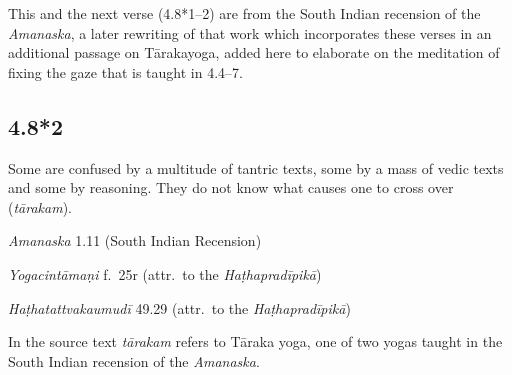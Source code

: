 \begin{ekdosis}
\begin{philcomm}[hp04_008_1]
This and the next verse (4.8*1–2) are from the South Indian recension of the \emph{Amanaska}, a later rewriting of that work which incorporates these verses in an additional passage on Tārakayoga, added here to elaborate on the meditation of fixing the gaze that is taught in 4.4–7. 
\end{philcomm}

\subsection*{4.8*2}
\begin{translation}[hp04_008_2]
Some are confused by a multitude of tantric texts, some by a mass of vedic texts and some by reasoning. They do not know what causes one to cross over (\emph{tārakam}).%
\end{translation}


\begin{sources}[hp04_008_2]
\emph{Amanaska} 1.11 (South Indian Recension)
\begin{versinnote}
\end{versinnote}
\end{sources}

\begin{testimonia}[hp04_008_2]
\emph{Yogacintāmaṇi} f.~25r (attr.~to the \emph{Haṭhapradīpikā})
\begin{versinnote}
\end{versinnote}

\emph{Haṭhatattvakaumudī} 49.29 (attr.~to the \emph{Haṭhapradīpikā})
\begin{versinnote}
\end{versinnote}
\end{testimonia}

\begin{philcomm}[hp04_008_2]
In the source text \emph{tārakam} refers to Tāraka yoga, one of two yogas taught in the South Indian recension of the \emph{Amanaska}.


\end{philcomm}
\end{ekdosis}
